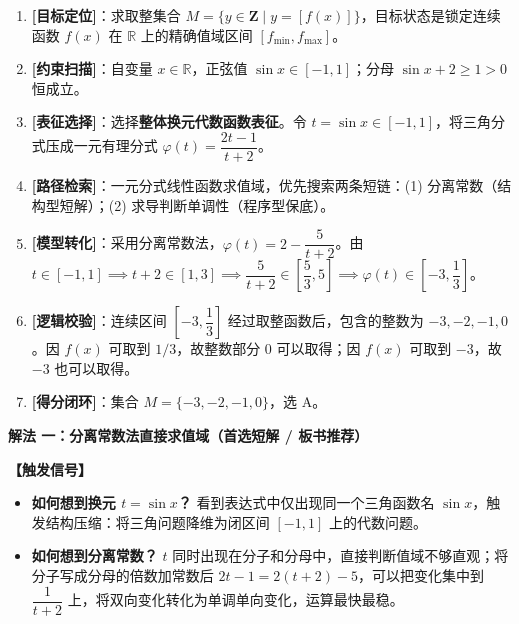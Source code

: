 \documentclass[11pt,a4paper,fontset=fandol]{ctexart}
\newcommand{\method}[1]{\par\medskip\noindent\textbf{解法 #1}\par}
\begin{document}
\medskip
\begin{tcolorbox}[colback=gray!4,colframe=ink!70,boxrule=0.7pt,arc=1mm,before skip=6pt,after skip=6pt,top=4pt,bottom=4pt,title=\textbf{决策路线}]
\begin{enumerate}[label=\textbf{\arabic*\ },leftmargin=1.8em]
  \item \textbf{[目标定位]}：求取整集合 \(M=\{y \in \mathbf{Z} \mid y=[f(x)]\}\)，目标状态是锁定连续函数 \(f(x)\) 在 \(\mathbb{R}\) 上的精确值域区间 \([f_{\min}, f_{\max}]\)。
  \item \textbf{[约束扫描]}：自变量 \(x \in \mathbb{R}\)，正弦值 \(\sin x \in [-1, 1]\)；分母 \(\sin x + 2 \ge 1 > 0\) 恒成立。
  \item \textbf{[表征选择]}：选择\textbf{整体换元代数函数表征}。令 \(t = \sin x \in [-1, 1]\)，将三角分式压成一元有理分式 \(\varphi(t) = \dfrac{2t - 1}{t + 2}\)。
  \item \textbf{[路径检索]}：一元分式线性函数求值域，优先搜索两条短链：(1) 分离常数（结构型短解）；(2) 求导判断单调性（程序型保底）。
  \item \textbf{[模型转化]}：采用分离常数法，\(\varphi(t) = 2 - \dfrac{5}{t + 2}\)。由 \(t \in [-1,1] \implies t+2 \in [1,3] \implies \dfrac{5}{t+2} \in \left[\dfrac{5}{3}, 5\right] \implies \varphi(t) \in \left[-3, \dfrac{1}{3}\right]\)。
  \item \textbf{[逻辑校验]}：连续区间 \(\left[-3, \dfrac{1}{3}\right]\) 经过取整函数后，包含的整数为 \(-3, -2, -1, 0\)。因 \(f(x)\) 可取到 \(1/3\)，故整数部分 \(0\) 可以取得；因 \(f(x)\) 可取到 \(-3\)，故 \(-3\) 也可以取得。
  \item \textbf{[得分闭环]}：集合 \(M = \{-3, -2, -1, 0\}\)，选 A。
\end{enumerate}
\end{tcolorbox}

\method{一：分离常数法直接求值域（首选短解 / 板书推荐）}

\noindent\textbf{【触发信号】}
\begin{itemize}[leftmargin=1.5em]
  \item \textbf{如何想到换元 $t=\sin x$？} 看到表达式中仅出现同一个三角函数名 \(\sin x\)，触发结构压缩：将三角问题降维为闭区间 \([-1,1]\) 上的代数问题。
  \item \textbf{如何想到分离常数？} \(t\) 同时出现在分子和分母中，直接判断值域不够直观；将分子写成分母的倍数加常数后 \(2t-1 = 2(t+2)-5\)，可以把变化集中到 \(\dfrac{1}{t+2}\) 上，将双向变化转化为单调单向变化，运算最快最稳。
\end{itemize}
\end{document}

